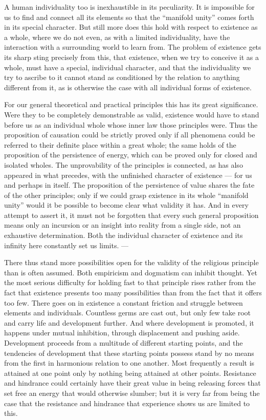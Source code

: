 \documentclass[12pt,a4paper,openany]{book}
\newcommand{\opage}[1]{\marginnote{\footnotesize\textit{[#1]}}}
\begin{document}
A human individuality too is inexhaustible in its peculiarity. It is impossible for us
to find and connect all its elements so that the ``manifold unity'' comes forth in its
special character. But still more does this hold with respect to existence as a whole,
where we do not even, as with a limited individuality, have the interaction with a
surrounding world to learn from. The problem of existence gets its sharp sting precisely
from this, that existence, when we try to conceive it as a whole, must have a special,
individual character, and
\setcounter{footnote}{0}%
\opage{242}that the individuality we try to ascribe to it cannot stand as conditioned by the
relation to anything different from it, as is otherwise the case with all individual
forms of existence.


For our general theoretical and practical principles this has its great significance.
Were they to be completely demonstrable as valid, existence would have to stand before us
as an individual whole whose inner law those principles were. Thus the proposition of
causation could be strictly proved only if all phenomena could be referred to their
definite place within a great whole; the same holds of the proposition of the persistence
of energy, which can be proved only for closed and isolated wholes. The unprovability of
the principles is connected, as has also appeared in what precedes, with the unfinished
character of existence --- for us and perhaps in itself. The proposition of the
persistence of value shares the fate of the other principles; only if we could grasp
existence in its whole ``manifold unity'' would it be possible to become clear what
validity it has. And in every attempt to assert it, it must not be forgotten that every
such general proposition means only an incursion or an insight into reality from a single
side, not an exhaustive determination. Both the individual character of existence and its
infinity here constantly set us limits. ---

There thus stand more possibilities open for the validity of the religious principle than
is often assumed. Both empiricism and dogmatism can inhibit thought. Yet the most serious
difficulty for holding fast to that principle rises rather from the fact that existence
presents too many possibilities than from the fact that it offers too few. There goes on
in existence a constant friction and struggle between elements and individuals. Countless
germs are cast out, but only few take root and carry life and development further. And
where development is promoted, it happens under mutual inhibition, through displacement
and pushing aside. Development proceeds from
\setcounter{footnote}{0}%
\opage{243}a multitude of different starting points, and the tendencies of development that
these starting points possess stand by no means from the first in harmonious relation to
one another. Most frequently a result is attained at one point only by nothing being
attained at other points. Resistance and hindrance could certainly have their great value
in being releasing forces that set free an energy that would otherwise slumber; but it is
very far from being the case that the resistance and hindrance that experience shows us
are limited to this.
\end{document}
